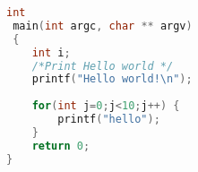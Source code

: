 \documentclass[a4paper]{article}
\begin{document}
 \begin{lstlisting}[language={C}]
 int
 main(int argc, char ** argv)
 {
 	int i;
	/*Print Hello world */
	printf("Hello world!\n");
   
	for(int j=0;j<10;j++) {
		printf("hello");
	}
	return 0;
}
\end{lstlisting}
\end{document}
